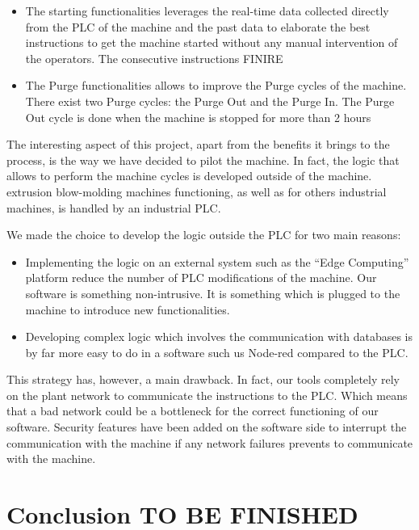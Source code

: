 \begin{itemize}
    \item The starting functionalities leverages the real-time data collected directly from the PLC of the machine and the past data to elaborate the best instructions to get the machine started without any manual intervention of the operators. The consecutive instructions FINIRE
    \item The Purge functionalities allows to improve the Purge cycles of the machine. There exist two Purge cycles: the Purge Out and the Purge In. The Purge Out cycle is done when the machine is stopped for more than 2 hours 
\end{itemize}

The interesting aspect of this project, apart from the benefits it brings to the process, is the way we have decided to pilot the machine. In fact, the logic that allows to perform the machine cycles is developed outside of the machine. extrusion blow-molding machines functioning, as well as for others industrial machines, is handled by an industrial PLC. 

We made the choice to develop the logic outside the PLC for two main reasons: 

\begin{itemize}
    \item Implementing the logic on an external system such as the “Edge Computing” platform reduce the number of PLC modifications of the machine. Our software is something non-intrusive. It is something which is plugged to the machine to introduce new functionalities.
    \item Developing complex logic which involves the communication with databases is by far more easy to do in a software such us Node-red compared to the PLC.
\end{itemize}

This strategy has, however, a main drawback. In fact, our tools completely rely on the plant network to communicate the instructions to the PLC. Which means that a bad network could be a bottleneck for the correct functioning of our software. Security features have been added on the software side to interrupt the communication with the machine if any network failures prevents to communicate with the machine.     


\section{Conclusion TO BE FINISHED}

